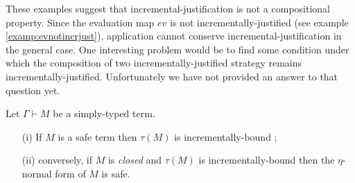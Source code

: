 These examples suggest that incremental-justification is not a compositional property. Since the
 evaluation map $ev$ is not incrementally-justified (see example \ref{examp:evnotincrjust}), 
application cannot conserve incremental-justification in the general case. One interesting problem would be to find some condition under which  the composition of two incrementally-justified strategy remains 
incrementally-justified.
Unfortunately we have not provided an answer to that question yet.


\begin{lem}
\label{lem:safe_imp_incrbound} Let $\Gamma \vdash M$ be a
simply-typed term.
\begin{itemize}
\item[(i)] If $M$ is a safe term then $\tau(M)$ is incrementally-bound ;
\item[(ii)] conversely, if $M$ is \emph{closed} and $\tau(M)$ is incrementally-bound then the $\eta$-normal form of $M$ is safe.
\end{itemize}
\end{lem}

